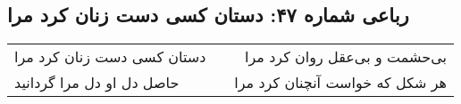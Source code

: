 \begin{center}
\section*{رباعی شماره ۴۷: دستان کسی دست زنان کرد مرا}
\label{sec:0047}
\begin{longtable}{l p{0.5cm} r}
دستان کسی دست زنان کرد مرا
&&
بی‌حشمت و بی‌عقل روان کرد مرا
\\
حاصل دل او دل مرا گردانید
&&
هر شکل که خواست آنچنان کرد مرا
\\
\end{longtable}
\end{center}
